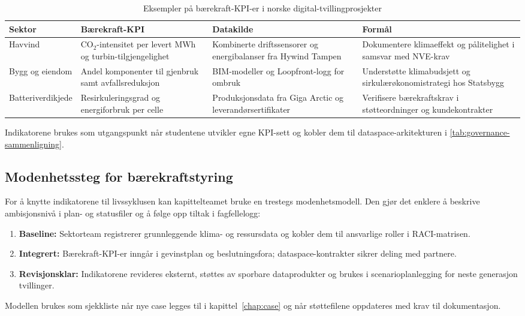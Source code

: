 \begin{table}[h]
    \centering
    \caption{Eksempler på bærekraft-KPI-er i norske digital-tvillingprosjekter}
    \label{tab:baerekraft-kpi}
    \begin{tabular}{p{2.9cm}p{3.6cm}p{3.2cm}p{3.3cm}}
        \toprule
        Sektor & Bærekraft-KPI & Datakilde & Formål \\
        \midrule
        Havvind & CO$_2$-intensitet per levert MWh og turbin-tilgjengelighet & Kombinerte driftssensorer og energibalanser fra Hywind Tampen & Dokumentere klimaeffekt og pålitelighet i samsvar med NVE-krav\citep{equinor2023hywindtampen,nve2023havvindfakta} \\
        Bygg og eiendom & Andel komponenter til gjenbruk samt avfallsreduksjon & BIM-modeller og Loopfront-logg for ombruk & Understøtte klimabudsjett og sirkulærøkonomistrategi hos Statsbygg\citep{statsbygg2023loopfront,regjeringen2021sirkulaer} \\
        Batteriverdikjede & Resirkuleringsgrad og energiforbruk per celle & Produksjonsdata fra Giga Arctic og leverandørsertifikater & Verifisere bærekraftskrav i støtteordninger og kundekontrakter\citep{freyr2024giga,enova2023batteri} \\
        \bottomrule
    \end{tabular}
\end{table}

Indikatorene brukes som utgangspunkt når studentene utvikler egne KPI-sett og kobler dem til dataspace-arkitekturen i \autoref{tab:governance-sammenligning}.

\subsection*{Modenhetssteg for bærekraftstyring}
For å knytte indikatorene til livssyklusen kan kapittelteamet bruke en trestegs modenhetsmodell. Den gjør det enklere å beskrive ambisjonsnivå i plan- og statusfiler og å følge opp tiltak i fagfellelogg:
\begin{enumerate}
    \item \textbf{Baseline:} Sektorteam registrerer grunnleggende klima- og ressursdata og kobler dem til ansvarlige roller i RACI-matrisen.
    \item \textbf{Integrert:} Bærekraft-KPI-er inngår i gevinstplan og beslutningsfora; dataspace-kontrakter sikrer deling med partnere.
    \item \textbf{Revisjonsklar:} Indikatorene revideres eksternt, støttes av sporbare dataprodukter og brukes i scenarioplanlegging for neste generasjon tvillinger.
\end{enumerate}
Modellen brukes som sjekkliste når nye case legges til i kapittel~\ref{chap:case} og når støttefilene oppdateres med krav til dokumentasjon.

